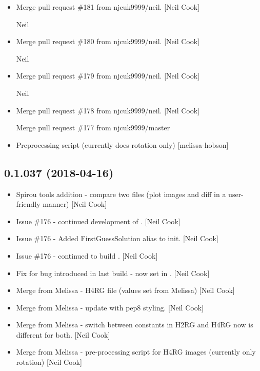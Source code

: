 \documentclass[a4paper,10pt,english]{report}
\begin{document}
\begin{itemize}
\item {} 
Merge pull request \#181 from njcuk9999/neil. {[}Neil Cook{]}

Neil

\item {} 
Merge pull request \#180 from njcuk9999/neil. {[}Neil Cook{]}

Neil

\item {} 
Merge pull request \#179 from njcuk9999/neil. {[}Neil Cook{]}

Neil

\item {} 
Merge pull request \#178 from njcuk9999/neil. {[}Neil Cook{]}

Merge pull request \#177 from njcuk9999/master

\item {} 
Preprocessing script (currently does rotation only) {[}melissa-hobson{]}

\end{itemize}


\subsection{0.1.037 (2018-04-16)}
\label{\detokenize{misc/changelog:id461}}\begin{itemize}
\item {} 
Spirou tools addition - compare two files (plot images and diff in a
user-friendly manner) {[}Neil Cook{]}

\item {} 
Issue \#176 - continued development of . {[}Neil Cook{]}

\item {} 
Issue \#176 - Added FirstGuessSolution alias to init. {[}Neil Cook{]}

\item {} 
Issue \#176 - continued to build . {[}Neil Cook{]}

\item {} 
Fix for bug introduced in last build -  now set in
. {[}Neil Cook{]}

\item {} 
Merge from Melissa - H4RG  file (values set from
Melissa) {[}Neil Cook{]}

\item {} 
Merge from Melissa - update  with pep8 styling.
{[}Neil Cook{]}

\item {} 
Merge from Melissa - switch between constants in H2RG and H4RG now
 is different for both. {[}Neil Cook{]}

\item {} 
Merge from Melissa - pre-processing script for H4RG images (currently
only rotation) {[}Neil Cook{]}

\end{itemize}
\end{document}
